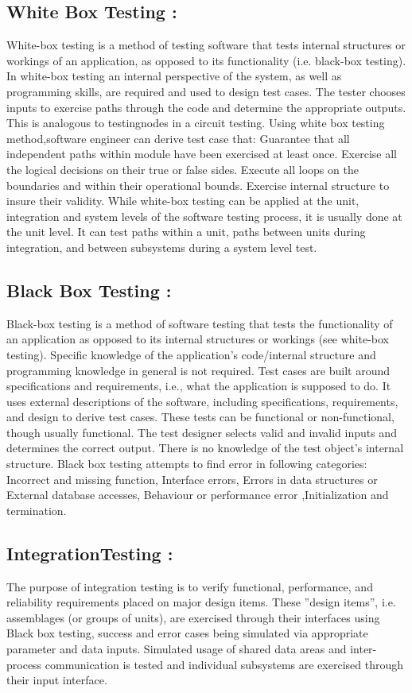 \documentclass[oneside,a4paper,12pt]{report}
\begin{document}
{\subsection{White Box Testing : }
White-box testing is a method of testing software that tests internal structures or workings of an application, as opposed to its functionality (i.e. black-box testing). In white-box testing an internal perspective of the system, as well as programming skills, are required and used to design test cases. The tester chooses inputs to exercise paths through the code and determine the appropriate outputs. This is analogous to testingnodes in a circuit testing. Using white box testing method,software engineer can derive test case that: Guarantee that all independent paths within module have been exercised at least once. Exercise all the logical decisions on their true or false sides. Execute all loops on the boundaries and within their operational bounds. Exercise internal structure to insure their validity. While white-box testing can be applied at the unit, integration and system levels of the software testing process, it is usually done at the unit level. It can test paths within a unit, paths between units during integration, and between subsystems during a system level test.

\subsection{Black Box Testing : }
Black-box testing is a method of software testing that tests the functionality of an application as opposed to its internal structures or workings (see white-box testing). Specific knowledge of the application’s code/internal structure and programming knowledge in general is not required. Test cases are built around specifications and requirements, i.e., what the application is supposed to do. It uses external descriptions of the software, including specifications, requirements, and design to derive test cases. These tests can be functional or non-functional, though usually functional. The test designer selects valid and invalid inputs and determines the correct output. There is no knowledge of the test object’s internal structure. Black box testing attempts to find error in following categories: Incorrect and missing function, Interface errors, Errors in data structures or External database accesses, Behaviour or performance error ,Initialization and termination.

\subsection{IntegrationTesting : }
The purpose of integration testing is to verify functional, performance, and reliability requirements placed on major design items. These ”design items”, i.e. assemblages (or groups of units), are exercised through their interfaces using Black box testing, success and error cases being simulated via appropriate parameter and data inputs. Simulated usage of shared data areas and inter-process communication is tested and individual subsystems are exercised through their input interface.

}
\end{document}

